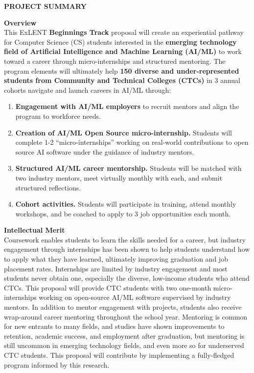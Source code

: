 \begin{center}
\uppercase{\textbf{Project Summary}}
\end{center}

\textbf{Overview} \\
This ExLENT \textbf{Beginnings Track} proposal will create an experiential pathway for Computer Science (CS) students interested in the \textbf{emerging technology field of Artificial Intelligence and Machine Learning (AI/ML)} to work toward a career through micro-internships and structured mentoring. The program elements will ultimately help \textbf{150 diverse and under-represented students from Community and Technical Colleges (CTCs)} in 3 annual cohorts navigate and launch careers in AI/ML through:

\begin{enumerate}
    \item \textbf{Engagement with AI/ML employers} to recruit mentors and align the program to workforce needs.
    \item \textbf{Creation of AI/ML Open Source micro-internship.} Students will complete 1-2 ``micro-internships'' working on real-world contributions to open source AI software under the guidance of industry mentors.
    \item \textbf{Structured AI/ML career mentorship.} Students will be matched with two industry mentors, meet virtually monthly with each, and submit structured reflections.
    \item \textbf{Cohort activities.} Students will participate in training, attend monthly workshops, and be coached to apply to 3 job opportunities each month.
\end{enumerate}

\textbf{Intellectual Merit} \\
Coursework enables students to learn the skills needed for a career, but industry engagement through internships has been shown to help students understand how to apply what they have learned, ultimately improving graduation and job placement rates. Internships are limited by industry engagement and most students never obtain one, especially the diverse, low-income students who attend CTCs. This proposal will provide CTC students with two one-month micro-internships working on open-source AI/ML software supervised by industry mentors. In addition to mentor engagement with projects, students also receive wrap-around career mentoring throughout the school year. Mentoring is common for new entrants to many fields, and studies have shown improvements to retention, academic success, and employment after graduation, but mentoring is still uncommon in emerging technology fields, and even more so for underserved CTC students. This proposal will contribute by implementing a fully-fledged program informed by this research.

